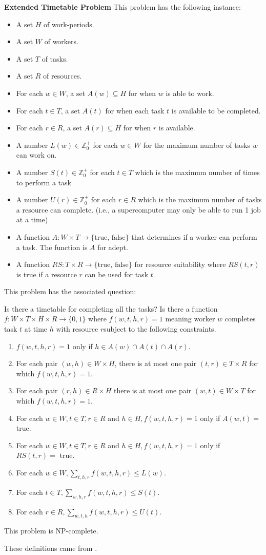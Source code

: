 \documentclass[12pt]{article}
\theoremstyle{definition}
\numberwithin{equation}{section}
\newcommand{\Z}{\mathbb{Z}}
\newcommand{\func}[3]{#1\colon #2 \rightarrow #3}
\newcommand{\ssteq}{\subseteq}
\begin{document}
\textbf{Extended Timetable Problem}
This problem has the following instance:
\begin{itemize}
	\item A set $H$ of work-periods.
	\item A set $W$ of workers.
	\item A set $T$ of tasks.  
	\item A set $R$ of resources.
	\item For each $w \in W$, a set $A(w) \ssteq H$ for when $w$ is able to work.
	\item For each $t \in T$, a set $A(t)$ for when each task $t$ is available to be completed. 
	\item For each $r \in R$, a set $A(r) \ssteq H$ for when $r$ is available.
	\item A number $L(w) \in \Z_0^+$ for each $w \in W$ for the maximum number of tasks $w$ can work on. 
	\item A number $S(t) \in \Z_0^+$ for each $t \in T$ which is the maximum number of times to perform a task
	\item A number $U(r) \in \Z_0^+$ for each $r \in R$ which is the maximum number of tasks a resource can complete. (i.e., a supercomputer may only be able to run 1 job at a time)
	\item A function $\func{A}{W \times T}{\{\text{true, false}\}}$ that determines if a worker can perform a task. The function is $A$ for adept.
	\item A function $\func{RS}{T\times R}{\{\text{true, false}\}}$ for resource suitability where $RS(t,r)$ is true if a resource $r$ can be used for task $t$. 
\end{itemize}

This problem has the associated question:

Is there a timetable for completing all the tasks? Is there a function $\func{f}{W\times T\times H \times R}{\{0,1\}}$ where $f(w,t,h,r) = 1$ meaning worker $w$ completes task $t$ at time $h$ with resource $r$subject to the following constraints. 
\begin{enumerate}
	\item $f(w,t,h,r) = 1$ only if $h \in A(w) \cap A(t) \cap A(r)$. 
	\item For each pair $(w,h) \in W \times H$, there is at most one pair $(t,r) \in T \times R$ for which $f(w,t,h,r) = 1$. 
	\item For each pair $(r,h) \in R\times H$ there is at most one pair $(w,t) \in W \times T$ for which $f(w,t,h,r) = 1$. 
	\item For each $w \in W, t \in T, r \in R$ and $h \in H, f(w,t,h,r) = 1$ only if $A(w,t) =$ true.
	\item For each $w \in W, t \in T, r \in R$ and $h \in H, f(w,t,h,r) = 1$ only if $RS(t,r) = $ true.
	\item For each $w \in W, \sum_{t,h,r} f(w,t,h,r) \le L(w)$.
	\item For each $t \in T, \sum_{w,h,r} f(w,t,h,r) \le S(t)$.  
	\item For each $r \in R, \sum_{w,t,h} f(w,t,h,r) \le U(t)$.
\end{enumerate}
This problem is NP-complete.

These definitions came from \cite{lovelace2010complexity}. 


\end{document}
